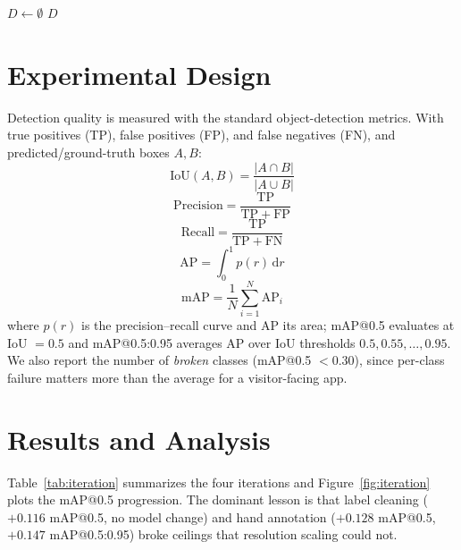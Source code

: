 \begin{algorithm}[htbp]
\caption{End-to-end NMS detection parsing (on-device)}
$D \leftarrow \emptyset$\;
\Return $D$\;
\end{algorithm}

\section{Experimental Design}

Detection quality is measured with the standard object-detection metrics. With true
positives (TP), false positives (FP), and false negatives (FN), and predicted/ground-truth
boxes $A,B$:
\begin{equation}\mathrm{IoU}(A,B)=\frac{|A\cap B|}{|A\cup B|}\end{equation}
\begin{equation}\mathrm{Precision}=\frac{\mathrm{TP}}{\mathrm{TP}+\mathrm{FP}}\end{equation}
\begin{equation}\mathrm{Recall}=\frac{\mathrm{TP}}{\mathrm{TP}+\mathrm{FN}}\end{equation}
\begin{equation}\mathrm{AP}=\int_{0}^{1} p(r)\,\mathrm{d}r\end{equation}
\begin{equation}\mathrm{mAP}=\frac{1}{N}\sum_{i=1}^{N}\mathrm{AP}_i\end{equation}
where $p(r)$ is the precision--recall curve and AP its area; mAP@0.5 evaluates at
IoU $=0.5$ and mAP@0.5:0.95 averages AP over IoU thresholds $0.5,0.55,\dots,0.95$. We
also report the number of \emph{broken} classes (mAP@0.5 $<0.30$), since per-class
failure matters more than the average for a visitor-facing app.

\section{Results and Analysis}

Table~\ref{tab:iteration} summarizes the four iterations and Figure~\ref{fig:iteration}
plots the mAP@0.5 progression. The dominant lesson is that label cleaning ($+0.116$
mAP@0.5, no model change) and hand annotation ($+0.128$ mAP@0.5, $+0.147$ mAP@0.5:0.95)
broke ceilings that resolution scaling could not.

